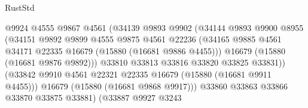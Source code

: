 \begin{lexlean}{RustStd}
\begin{coremodule}
                                        @9924
                                        @4555
                                        @9867
                                        @4561
                                        (@34139
                                          @9893
                                          @9902
                                          (@34144
                                            @9893
                                            @9900
                                            @8955
                                            (@34151
                                              @9892
                                              @9899
                                              @4555
                                              @9875
                                              @4561
                                              @22236
                                              (@34165
                                                @9885
                                                @4561
                                                @34171
                                                @22335
                                                @16679
                                                (@15880 (@16681 @9886 @4455)))
                                              @16679
                                              (@15880 (@16681 @9876 @9892)))
                                            @33810
                                            @33813
                                            @33816
                                            @33820
                                            @33825
                                            @33831))
                                        (@33842
                                          @9910
                                          @4561
                                          @22321
                                          @22335
                                          @16679
                                          (@15880 (@16681 @9911 @4455)))
                                        @16679
                                        (@15880 (@16681 @9868 @9917)))
                                      @33860
                                      @33863
                                      @33866
                                      @33870
                                      @33875
                                      @33881)
                                    (@33887
                                      @9927
                                      @3243

\end{coremodule}
\end{lexlean}
